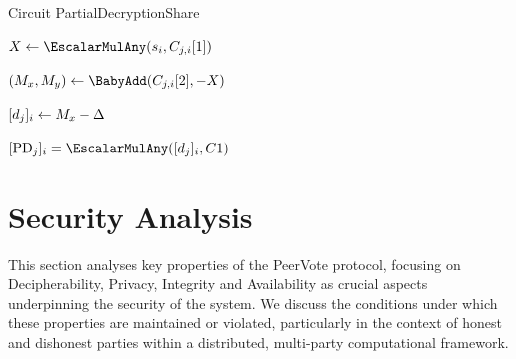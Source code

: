 \documentclass[runningheads]{llncs}
\begin{document}
\begin{algorithm}[H]
\caption{Circuit PartialDecryptionShare}
\label{alg:circuit_proof_pds}


\BlankLine

$X \leftarrow \EscalarMulAny(\PartySecretKey{i}, \EncryptedPartialDecryptionKeyShare{j}{i}[1])$\; %

$(M_x, M_y) \leftarrow \BabyAdd(\EncryptedPartialDecryptionKeyShare{j}{i}[2], - X)$\; %

$[d_{j}]_{i} \leftarrow M_x - \Delta$\;

\Assert $\SharePartialDecryptionFromTo{j}{i} = \EscalarMulAny(\PartialDecryptionKeyShare{j}{i}, \TotalA{})$
\end{algorithm}



\section{Security Analysis}

This section analyses key properties of the PeerVote protocol, focusing on Decipherability, Privacy, Integrity and Availability as crucial aspects underpinning the security of the system. We discuss the conditions under which these properties are maintained or violated, particularly in the context of honest and dishonest parties within a distributed, multi-party computational framework.

\newpage

\end{document}
